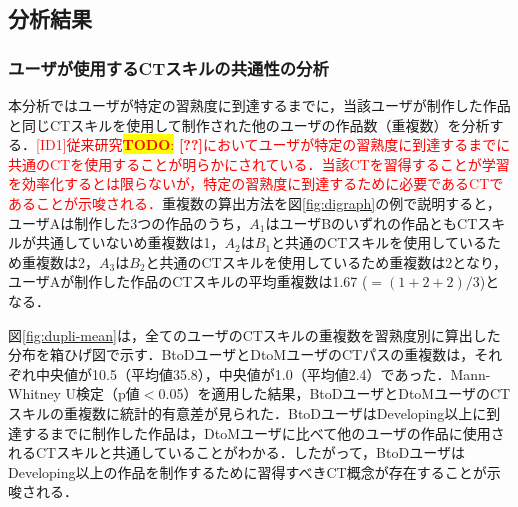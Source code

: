 \documentclass[submit,ses,noauthor]{ipsj}
\newcommand{\todo}[1]{\colorbox{yellow}{{\bf TODO}:}{\color{red} {\textbf{[#1]}}}}
\begin{document}
\vspace{-2mm}
\subsection{分析結果}\label{sec:3-analysis}

\subsubsection{ユーザが使用するCTスキルの共通性の分析}\label{subsec:path-analysis}

本分析ではユーザが特定の習熟度に到達するまでに，当該ユーザが制作した作品と同じCTスキルを使用して制作された他のユーザの作品数（重複数）を分析する．\textcolor{red}{[ID1]従来研究\todo{??}においてユーザが特定の習熟度に到達するまでに共通のCTを使用することが明らかにされている．当該CTを習得することが学習を効率化するとは限らないが，特定の習熟度に到達するために必要であるCTであることが示唆される．}重複数の算出方法を図\ref{fig:digraph}の例で説明すると，ユーザAは制作した3つの作品のうち，$A_1$はユーザBのいずれの作品ともCTスキルが共通していないめ重複数は1，$A_2$は$B_1$と共通のCTスキルを使用しているため重複数は2，$A_3$は$B_2$と共通のCTスキルを使用しているため重複数は2となり，ユーザAが制作した作品のCTスキルの平均重複数は1.67 ($=(1 + 2 + 2) / 3$)となる．

図\ref{fig:dupli-mean}は，全てのユーザのCTスキルの重複数を習熟度別に算出した分布を箱ひげ図で示す．BtoDユーザとDtoMユーザのCTパスの重複数は，それぞれ中央値が10.5（平均値35.8），中央値が1.0（平均値2.4）であった．Mann-Whitney U検定（p値$<$0.05）を適用した結果，BtoDユーザとDtoMユーザのCTスキルの重複数に統計的有意差が見られた．BtoDユーザはDeveloping以上に到達するまでに制作した作品は，DtoMユーザに比べて他のユーザの作品に使用されるCTスキルと共通していることがわかる．したがって，BtoDユーザはDeveloping以上の作品を制作するために習得すべきCT概念が存在することが示唆される．

\end{document}
